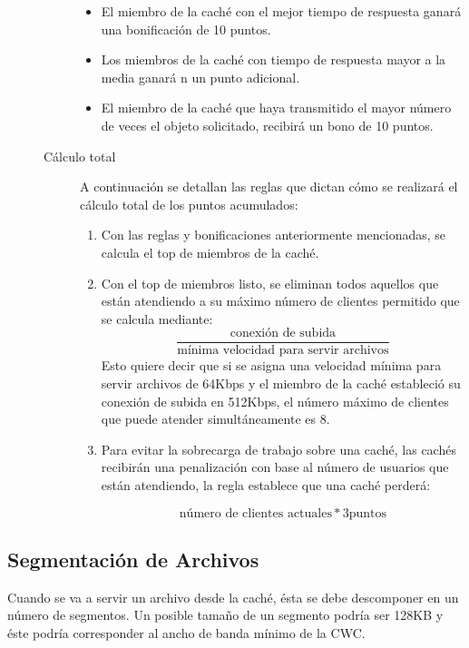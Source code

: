 \begin{description}
\begin{description}
		\begin{itemize}
		\item El miembro de la caché con el mejor tiempo de respuesta ganará una bonificación de 10 puntos.
		\item Los miembros de la caché con tiempo de respuesta mayor a la media ganará	n un punto adicional.
		\item El miembro de la caché que haya transmitido el mayor número de veces el  objeto solicitado, recibirá un bono de 10 puntos.
		\end{itemize}

	\item[Cálculo total] A continuación se detallan las reglas que dictan cómo se realizará el cálculo total de los puntos acumulados: 
	
		\begin{enumerate}
		\item Con las reglas y bonificaciones anteriormente mencionadas, se calcula el top de miembros de la caché.
		\item Con el top de miembros listo, se eliminan todos aquellos que están atendiendo a su máximo número de clientes permitido que se calcula mediante: 
		$$ \frac {\text{conexión de subida}}{\text{mínima velocidad para servir archivos}} $$ 
		Esto quiere decir que si se asigna una velocidad mínima para servir archivos de 64Kbps y el miembro de la caché estableció su conexión de subida en 512Kbps, el número máximo de clientes que puede atender simultáneamente es 8.
		\item Para evitar la sobrecarga de trabajo sobre una caché, las cachés recibirán una penalización con base al número de usuarios que están atendiendo, la regla establece que una caché perderá: 
		
		$$ \text{número de clientes actuales} * 3 \text{puntos} $$
		\end{enumerate}
	
	\end{description}

\end{description}


\subsection{Segmentación de Archivos}

Cuando se va a servir un archivo desde la caché, ésta se debe descomponer en un número de segmentos. Un posible tamaño de un segmento podría ser 128KB y éste podría corresponder al ancho de banda mínimo de la CWC. 

